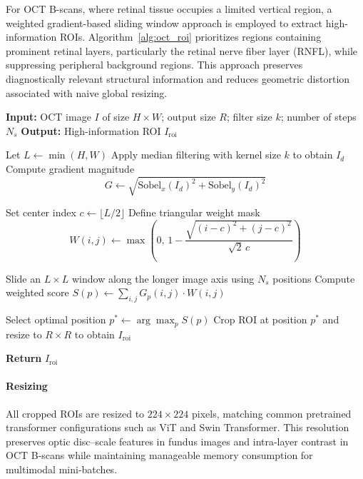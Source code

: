 \documentclass[preprint,12pt]{elsarticle}
\begin{document}
For OCT B-scans, where retinal tissue occupies a limited vertical region, a weighted gradient-based sliding window approach is employed to extract high-information ROIs. Algorithm~\ref{alg:oct_roi} prioritizes regions containing prominent retinal layers, particularly the retinal nerve fiber layer (RNFL), while suppressing peripheral background regions. This approach preserves diagnostically relevant structural information and reduces geometric distortion associated with naive global resizing.

\begin{algorithm}[!t]
    \caption{Weighted Gradient-Based ROI Selection (OCT B-Scan)}
    \label{alg:oct_roi}
    \begin{algorithmic}[1]

        \STATE \textbf{Input:} OCT image $I$ of size $H \times W$; output size $R$; filter size $k$; number of steps $N_s$
        \STATE \textbf{Output:} High-information ROI $I_{\text{roi}}$

        \STATE Let $L \leftarrow \min(H, W)$
        \STATE Apply median filtering with kernel size $k$ to obtain $I_d$
        \STATE Compute gradient magnitude
        \[
            G \leftarrow \sqrt{\text{Sobel}_x(I_d)^2 + \text{Sobel}_y(I_d)^2}
        \]

        \STATE Set center index $c \leftarrow \lfloor L/2 \rfloor$
        \STATE Define triangular weight mask
        \[
            W(i,j) \leftarrow \max\!\left(0,\, 1 - \frac{\sqrt{(i-c)^2 + (j-c)^2}}{\sqrt{2}\,c}\right)
        \]

        \STATE Slide an $L \times L$ window along the longer image axis using $N_s$ positions
        \STATE Compute weighted score $S(p) \leftarrow \sum_{i,j} G_p(i,j)\cdot W(i,j)$
        \ENDFOR

        \STATE Select optimal position $p^* \leftarrow \arg\max_p S(p)$
        \STATE Crop ROI at position $p^*$ and resize to $R \times R$ to obtain $I_{\text{roi}}$

        \STATE \textbf{Return} $I_{\text{roi}}$

    \end{algorithmic}
\end{algorithm}

\paragraph{Resizing}
All cropped ROIs are resized to $224 \times 224$ pixels, matching common pretrained transformer configurations such as ViT and Swin Transformer. This resolution preserves optic disc–scale features in fundus images and intra-layer contrast in OCT B-scans while maintaining manageable memory consumption for multimodal mini-batches.
\end{document}
